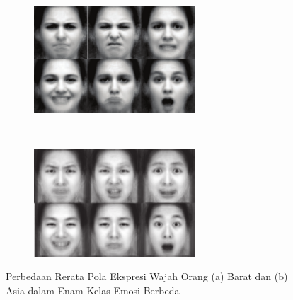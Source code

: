 \begin{figure}[t]
    \centering
    \begin{subfigure}[t]{6cm}
        \includegraphics[width=6cm]{gambar/rerata_ekspresi_wajah_barat.png}
        \caption{}
    \end{subfigure}
    ~~~
    \begin{subfigure}[t]{6cm}
        \includegraphics[width=6cm]{gambar/rerata_ekspresi_wajah_asia.png}
        \caption{}
    \end{subfigure}
    \caption[Perbedaan Rerata Pola Ekspresi Wajah Orang (a) Barat dan (b) Asia dalam Enam Kelas Emosi Berbeda]{Perbedaan Rerata Pola Ekspresi Wajah Orang (a) Barat dan (b) Asia dalam Enam Kelas Emosi Berbeda \protect{}}
    \label{fig:rerataekspresiwajah}
\end{figure}

